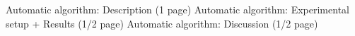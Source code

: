 Automatic algorithm: Description (1 page)
Automatic algorithm: Experimental setup + Results (1/2 page)
Automatic algorithm: Discussion (1/2 page)
